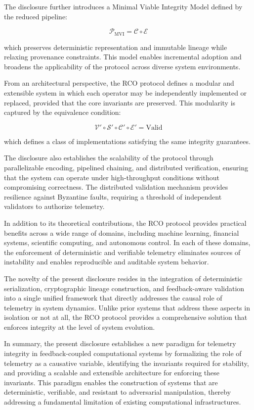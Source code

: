 The disclosure further introduces a Minimal Viable Integrity Model defined by the reduced pipeline:

\begin{equation}
\mathcal{P}_{\text{MVI}} = \mathcal{C} \circ \mathcal{E}
\end{equation}

which preserves deterministic representation and immutable lineage while relaxing provenance constraints. This model enables incremental adoption and broadens the applicability of the protocol across diverse system environments.

From an architectural perspective, the RCO protocol defines a modular and extensible system in which each operator may be independently implemented or replaced, provided that the core invariants are preserved. This modularity is captured by the equivalence condition:

\begin{equation}
\mathcal{V}' \circ \mathcal{S}' \circ \mathcal{C}' \circ \mathcal{E}' = \text{Valid}
\end{equation}

which defines a class of implementations satisfying the same integrity guarantees.

The disclosure also establishes the scalability of the protocol through parallelizable encoding, pipelined chaining, and distributed verification, ensuring that the system can operate under high-throughput conditions without compromising correctness. The distributed validation mechanism provides resilience against Byzantine faults, requiring a threshold of independent validators to authorize telemetry.

In addition to its theoretical contributions, the RCO protocol provides practical benefits across a wide range of domains, including machine learning, financial systems, scientific computing, and autonomous control. In each of these domains, the enforcement of deterministic and verifiable telemetry eliminates sources of instability and enables reproducible and auditable system behavior.

The novelty of the present disclosure resides in the integration of deterministic serialization, cryptographic lineage construction, and feedback-aware validation into a single unified framework that directly addresses the causal role of telemetry in system dynamics. Unlike prior systems that address these aspects in isolation or not at all, the RCO protocol provides a comprehensive solution that enforces integrity at the level of system evolution.

In summary, the present disclosure establishes a new paradigm for telemetry integrity in feedback-coupled computational systems by formalizing the role of telemetry as a causative variable, identifying the invariants required for stability, and providing a scalable and extensible architecture for enforcing these invariants. This paradigm enables the construction of systems that are deterministic, verifiable, and resistant to adversarial manipulation, thereby addressing a fundamental limitation of existing computational infrastructures.